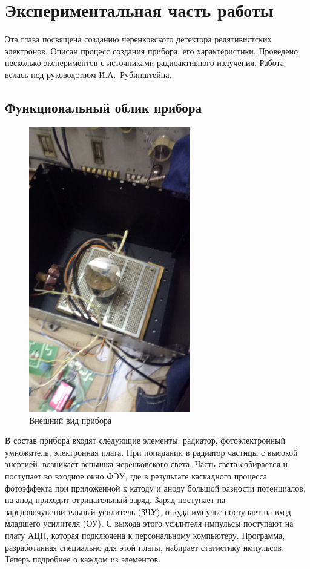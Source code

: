 \documentclass[12pt,a4paper]{report} %
\begin{document}
\chapter{Экспериментальная часть работы}
Эта глава посвящена созданию черенковского детектора релятивистских электронов. Описан процесс создания прибора, его характеристики. Проведено несколько экспериментов с источниками радиоактивного излучения. Работа велась под руководством И.А.~Рубинштейна.
\section{Функциональный облик прибора}
\begin{figure}[t]
	\hfill
	\includegraphics[width=70mm]{pictures/pribor.jpg}
	\hfill
	\caption{Внешний вид прибора}
	\label{pribor}
\end{figure}
В состав прибора входят следующие элементы: радиатор, фотоэлектронный умножитель, электронная плата. При попадании в радиатор частицы с высокой энергией, возникает вспышка черенковского света. Часть света собирается и поступает во входное окно ФЭУ, где в результате каскадного процесса фотоэффекта при приложенной к катоду и аноду большой разности потенциалов, на анод приходит отрицательный заряд. Заряд поступает на зарядовочувствительный усилитель (ЗЧУ), откуда импульс поступает на вход младшего усилителя (ОУ). С выхода этого усилителя импульсы поступают на плату АЦП, которая подключена к персональному компьютеру. Программа, разработанная специально для этой платы, набирает статистику импульсов. Теперь подробнее о каждом из элементов:
\end{document}
